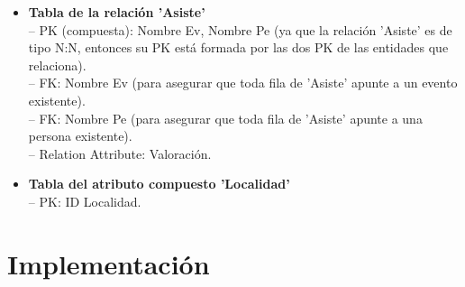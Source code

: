 \documentclass[12pt]{article}
\begin{document}
\begin{itemize}
        \item \textbf{Tabla de la relación 'Asiste'} \\
            -- PK (compuesta): Nombre Ev, Nombre Pe (ya que la relación 'Asiste' es de tipo N:N, entonces su PK está formada por las dos PK de las 
            entidades que relaciona). \\
            -- FK: Nombre Ev (para asegurar que toda fila de 'Asiste' apunte a un evento existente). \\
            -- FK: Nombre Pe (para asegurar que toda fila de 'Asiste' apunte a una persona existente). \\
            -- Relation Attribute: Valoración.
            
        \item \textbf{Tabla del atributo compuesto 'Localidad'} \\
            -- PK: ID Localidad.

    \end{itemize}

    \newpage
    \section{Implementación}
\end{document}
